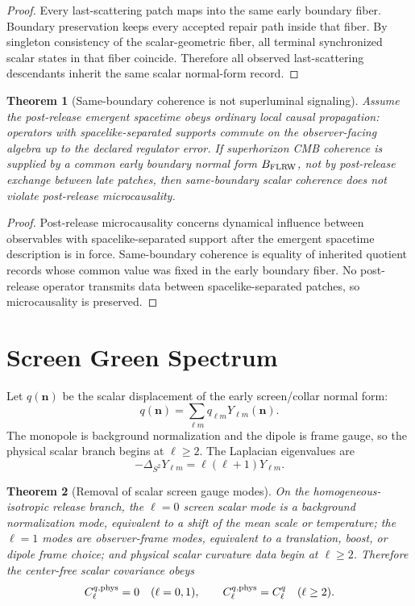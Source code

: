 \documentclass[11pt]{article}
\newtheorem{theorem}{Theorem}[section]
\begin{document}
\begin{proof}
Every last-scattering patch maps into the same early boundary fiber. Boundary preservation keeps
every accepted repair path inside that fiber. By singleton consistency of the scalar-geometric
fiber, all terminal synchronized scalar states in that fiber coincide. Therefore all observed
last-scattering descendants inherit the same scalar normal-form record.
\end{proof}

\begin{theorem}[Same-boundary coherence is not superluminal signaling]\label{thm:no-superluminal}
Assume the post-release emergent spacetime obeys ordinary local causal propagation: operators with
spacelike-separated supports commute on the observer-facing algebra up to the declared regulator
error. If superhorizon CMB coherence is supplied by a common early boundary normal form
\(B_{\rm FLRW}\), not by post-release exchange between late patches, then same-boundary scalar
coherence does not violate post-release microcausality.
\end{theorem}

\begin{proof}
Post-release microcausality concerns dynamical influence between observables with spacelike-separated
support after the emergent spacetime description is in force. Same-boundary coherence is equality of
inherited quotient records whose common value was fixed in the early boundary fiber. No post-release
operator transmits data between spacelike-separated patches, so microcausality is preserved.
\end{proof}

\section{Screen Green Spectrum}

Let \(q(\mathbf n)\) be the scalar displacement of the early screen/collar normal form:
\[
q(\mathbf n)=\sum_{\ell m}q_{\ell m}Y_{\ell m}(\mathbf n).
\]
The monopole is background normalization and the dipole is frame gauge, so the physical scalar
branch begins at \(\ell\ge2\). The Laplacian eigenvalues are
\[
-\Delta_{S^2}Y_{\ell m}=\ell(\ell+1)Y_{\ell m}.
\]

\begin{theorem}[Removal of scalar screen gauge modes]\label{thm:scalar-gauge-modes}
On the homogeneous-isotropic release branch, the \(\ell=0\) screen scalar mode is a background
normalization mode, equivalent to a shift of the mean scale or temperature; the \(\ell=1\) modes are
observer-frame modes, equivalent to a translation, boost, or dipole frame choice; and physical scalar
curvature data begin at \(\ell\ge2\). Therefore the center-free scalar covariance obeys
\[
C_\ell^{q,\rm phys}=0\quad(\ell=0,1),
\qquad
C_\ell^{q,\rm phys}=C_\ell^q\quad(\ell\ge2).
\]
\end{theorem}
\end{document}
